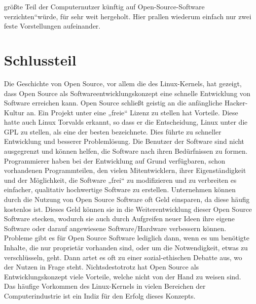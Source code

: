 \documentclass[a4paper,12pt]{article}
\begin{document}
größte Teil der Computernutzer künftig auf Open-Source-Software verzichten“\footnotemark[33] würde, für sehr weit hergeholt. Hier prallen wiederum einfach nur zwei feste Vorstellungen aufeinander.
\newpage
\section{Schlussteil}
Die Geschichte von Open Source, vor allem die des Linux-Kernels, hat gezeigt, dass Open Source als Softwareentwicklungskonzept eine schnelle Entwicklung von Software erreichen kann. Open Source schließt geistig an die anfängliche Hacker-Kultur an. Ein Projekt unter eine „freie“ Lizenz zu stellen hat Vorteile. Diese hatte auch Linux Torvalds erkannt, so dass er die Entscheidung, Linux unter die GPL zu stellen, als eine der besten bezeichnete. Dies führte zu schneller Entwicklung und besserer Problemlösung. Die Benutzer der Software sind nicht ausgegrenzt und können helfen, die Software nach ihren Bedürfnissen zu formen. Programmierer haben bei der Entwicklung auf Grund verfügbaren, schon vorhandenen Programmteilen, den vielen Mitentwicklern, ihrer Eigenständigkeit und der Möglichkeit, die Software „frei“ zu modifizieren und zu verbreiten es einfacher, qualitativ hochwertige Software zu erstellen. Unternehmen können durch die Nutzung von Open Source Software oft Geld einsparen, da diese häufig kostenlos ist. Dieses Geld können sie in die Weiterentwicklung dieser Open Source Software stecken, wodurch sie auch durch Aufgreifen neuer Ideen ihre eigene Software oder darauf angewiesene Software/Hardware verbessern können. Probleme gibt es für Open Source Software lediglich dann, wenn es um benötigte Inhalte, die nur proprietär vorhanden sind, oder um die Notwendigkeit, etwas zu verschlüsseln, geht. Dann artet es oft zu einer sozial-ethischen Debatte aus, wo der Nutzen in Frage steht. Nichtsdestotrotz hat Open Source als Entwicklungskonzept viele Vorteile, welche nicht von der Hand zu weisen sind. Das häufige Vorkommen des Linux-Kernels in vielen Bereichen der Computerindustrie ist ein Indiz für den Erfolg dieses Konzepts.
\newpage
{}
\end{document}
